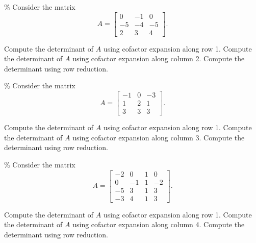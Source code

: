\documentclass{ximera}
\begin{document}
\begin{exercise}\%
    Consider the matrix
    \begin{equation*}
        A = \begin{bmatrix}
        0 & -1 & 0 \\ -5 & -4 & -5 \\ 2 & 3 & 4
        \end{bmatrix}.
    \end{equation*}
    \begin{tasks}
        \task Compute the determinant of $A$ using cofactor expansion along row 1.
        \task Compute the determinant of $A$ using cofactor expansion along column 2.
        \task Compute the determinant using row reduction.
    \end{tasks}
\end{exercise}

\begin{exercise}\%
    Consider the matrix
    \begin{equation*}
        A = \begin{bmatrix}
        -1 & 0 & -3 \\ 1 & 2 & 1 \\ 3 & 3 & 3
        \end{bmatrix}.
    \end{equation*}
    \begin{tasks}
        \task Compute the determinant of $A$ using cofactor expansion along row 1.
        \task Compute the determinant of $A$ using cofactor expansion along column 3.
        \task Compute the determinant using row reduction.
    \end{tasks}
\end{exercise}


\begin{exercise}\%
    Consider the matrix
    \begin{equation*}
        A = \begin{bmatrix}
        -2 & 0 & 1 & 0 \\ 0 & -1 & 1 & -2 \\ -5 &3 & 1 & 3 \\ -3 & 4 & 1 & 3
        \end{bmatrix}.
    \end{equation*}
    \begin{tasks}
        \task Compute the determinant of $A$ using cofactor expansion along row 1.
        \task Compute the determinant of $A$ using cofactor expansion along column 4.
        \task Compute the determinant using row reduction.
    \end{tasks}
\end{exercise}
\end{document}
